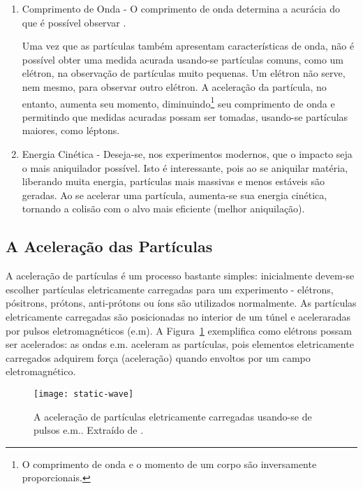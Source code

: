 \begin{enumerate}
\item Comprimento de Onda - O comprimento de onda determina a acurácia do que
é possível observar \cite{partadv}.

Uma vez que as par\-tí\-culas tam\-bém apresentam caracte\-rís\-ticas de onda,
não é pos\-sí\-vel obter uma medida acurada usando-se partículas comuns, como
um e\-lé\-tron, na observação de partículas muito pequenas. Um elétron não
serve, nem mesmo, para observar outro elétron. A aceleração da partícula, no
entanto, aumenta seu momento, diminuindo\footnote{O comprimento de onda e o
momento de um corpo são inversamente proporcionais.} seu comprimento de onda e
permitindo que medidas acuradas possam ser tomadas, usando-se partículas
maiores, como léptons.

\item Energia Cinética - Deseja-se, nos experimentos modernos, que o impacto
seja o mais aniquilador possível. Isto é interessante, pois ao se aniquilar
matéria, liberando muita energia, partículas mais massivas e menos estáveis são
geradas. Ao se acelerar uma partícula, aumenta-se sua energia cinética,
tornando a colisão com o alvo mais eficiente (melhor aniquilação).
\end{enumerate}

\subsection{A Aceleração das Partículas}

A aceleração de partículas  é um processo
bastante simples: inicialmente devem-se escolher partículas eletricamente
carregadas para um experimento - e\-lé\-trons, pó\-sitrons, pró\-tons,
anti-\-pró\-tons ou íons são utilizados normalmente. As par\-tí\-culas
eletricamente carregadas são posicionadas no interior de um túnel e
aceleraradas por pulsos eletromagnéticos
(e.m). A Figura~\ref{fig:acelera} exemplifica como elétrons possam ser
acelerados: as ondas e.m. aceleram as partículas, pois elementos eletricamente
carregados adquirem força (aceleração) quando envoltos por um campo
eletromagnético.

\begin{figure}
\begin{center}
\texttt{[image: static-wave]}
\end{center}
\caption[A aceleração de partículas.]{A aceleração de partículas eletricamente
carregadas usando-se de pulsos e.m.. Extraído de \cite{partadv}.}
\label{fig:acelera}
\end{figure}


